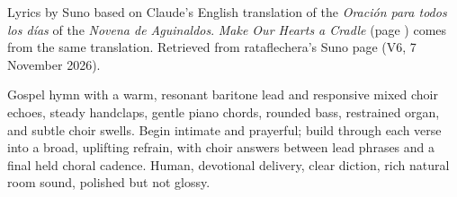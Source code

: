 
\label{sec:dwell-in-us}
\begin{notes}
Lyrics by Suno based on Claude's English translation of the \emph{Oración para todos los días} of the \emph{Novena de Aguinaldos}. \emph{Make Our Hearts a Cradle} (page \pageref{sec:make-our-hearts-a-cradle}) comes from the same translation. Retrieved from rataflechera's Suno page (V6, 7 November 2026).
\end{notes}
\begin{style}
Gospel hymn with a warm, resonant baritone lead and responsive mixed choir echoes, steady handclaps, gentle piano chords, rounded bass, restrained organ, and subtle choir swells. Begin intimate and prayerful; build through each verse into a broad, uplifting refrain, with choir answers between lead phrases and a final held choral cadence. Human, devotional delivery, clear diction, rich natural room sound, polished but not glossy.
\end{style}
